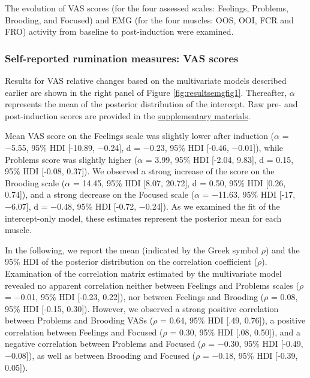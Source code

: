 \documentclass[a4paper,12pt,twoside,onecolumn,openright,final,oldfontcommands]{memoir}
\begin{document}
The evolution of VAS scores (for the four assessed scales: Feelings, Problems, Brooding, and Focused) and EMG (for the four muscles: OOS, OOI, FCR and FRO) activity from baseline to post-induction were examined.

\hypertarget{self-reported-rumination-measures-vas-scores}{%
\subsubsection{Self-reported rumination measures: VAS scores}\label{self-reported-rumination-measures-vas-scores}}

Results for VAS relative changes based on the multivariate models described earlier are shown in the right panel of Figure \ref{fig:resultsemgfig1}. Thereafter, \(\alpha\) represents the mean of the posterior distribution of the intercept. Raw pre- and post-induction scores are provided in the \protect\hyperlink{suppCH3}{supplementary materials}.

Mean VAS score on the Feelings scale was slightly lower after induction (\(\alpha\) = −5.55, 95\% HDI {[}-10.89, −0.24{]}, d = −0.23, 95\% HDI {[}-0.46, −0.01{]}), while Problems score was slightly higher (\(\alpha\) = 3.99, 95\% HDI {[}-2.04, 9.83{]}, d = 0.15, 95\% HDI {[}-0.08, 0.37{]}). We observed a strong increase of the score on the Brooding scale (\(\alpha\) = 14.45, 95\% HDI {[}8.07, 20.72{]}, d = 0.50, 95\% HDI {[}0.26, 0.74{]}), and a strong decrease on the Focused scale (\(\alpha\) = −11.63, 95\% HDI {[}-17, −6.07{]}, d = −0.48, 95\% HDI {[}-0.72, −0.24{]}). As we examined the fit of the intercept-only model, these estimates represent the posterior mean for each muscle.

In the following, we report the mean (indicated by the Greek symbol \(\rho\)) and the 95\% HDI of the posterior distribution on the correlation coefficient (\(\rho\)). Examination of the correlation matrix estimated by the multivariate model revealed no apparent correlation neither between Feelings and Problems scales (\(\rho\) = −0.01, 95\% HDI {[}-0.23, 0.22{]}), nor between Feelings and Brooding (\(\rho\) = 0.08, 95\% HDI {[}-0.15, 0.30{]}). However, we observed a strong positive correlation between Problems and Brooding VASs (\(\rho\) = 0.64, 95\% HDI {[}.49, 0.76{]}), a positive correlation between Feelings and Focused (\(\rho\) = 0.30, 95\% HDI {[}.08, 0.50{]}), and a negative correlation between Problems and Focused (\(\rho\) = −0.30, 95\% HDI {[}-0.49, −0.08{]}), as well as between Brooding and Focused (\(\rho\) = −0.18, 95\% HDI {[}-0.39, 0.05{]}).
\end{document}
